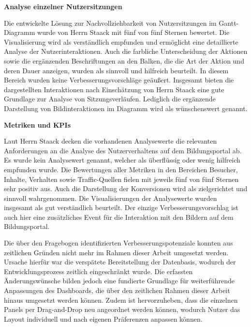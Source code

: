 \textbf{Analyse einzelner Nutzersitzungen}

Die entwickelte Lösung zur Nachvollziehbarkeit von Nutzersitzungen im Gantt-Diagramm wurde von Herrn Staack mit fünf von fünf Sternen bewertet. Die Visualisierung wird als verständlich empfunden und ermöglicht eine detaillierte Analyse der Nutzerinteraktionen. Auch die farbliche Unterscheidung der Aktionen sowie die ergänzenden Beschriftungen an den Balken, die die Art der Aktion und deren Dauer anzeigen, wurden als sinnvoll und hilfreich beurteilt. In diesem Bereich wurden keine Verbesserungsvorschläge geäußert. Insgesamt bieten die dargestellten Interaktionen nach Einschätzung von Herrn Staack eine gute Grundlage zur Analyse von Sitzungsverläufen. Lediglich die ergänzende Darstellung von Bildinteraktionen im Diagramm wird als wünschenswert genannt.

\textbf{Metriken und KPIs}

Laut Herrn Staack decken die vorhandenen Analysewerte die relevanten Anforderungen an die Analyse des Nutzerverhaltens auf dem Bildungsportal ab. Es wurde kein Analysewert genannt, welcher als überflüssig oder wenig hilfreich empfunden wurde. Die Bewertungen aller Metriken in den Bereichen Besucher, Inhalte, Verhalten sowie Traffic-Quellen fielen mit jeweils fünf von fünf Sternen sehr positiv aus. Auch die Darstellung der Konversionen wird als zielgerichtet und sinnvoll wahrgenommen. Die Visualisierungen der Analysewerte wurden insgesamt als gut verständlich beurteilt. Der einzige Verbesserungsvorschlag ist auch hier eine zusätzliches Event für die Interaktion mit den Bildern auf dem Bildungsportal.

Die über den Fragebogen identifizierten Verbesserungspotenziale konnten aus zeitlichen Gründen nicht mehr im Rahmen dieser Arbeit umgesetzt werden. Ursache hierfür war die verspätete Bereitstellung der Datenbasis, wodurch der Entwicklungsprozess zeitlich eingeschränkt wurde. Die erfassten Änderungswünsche bilden jedoch eine fundierte Grundlage für weiterführende Anpassungen des Dashboards, die über den zeitlichen Rahmen dieser Arbeit hinaus umgesetzt werden können. Zudem ist hervorzuheben, dass die einzelnen Panels per Drag-and-Drop neu angeordnet werden können, wodurch Nutzer das Layout individuell und nach eigenen Präferenzen anpassen können.